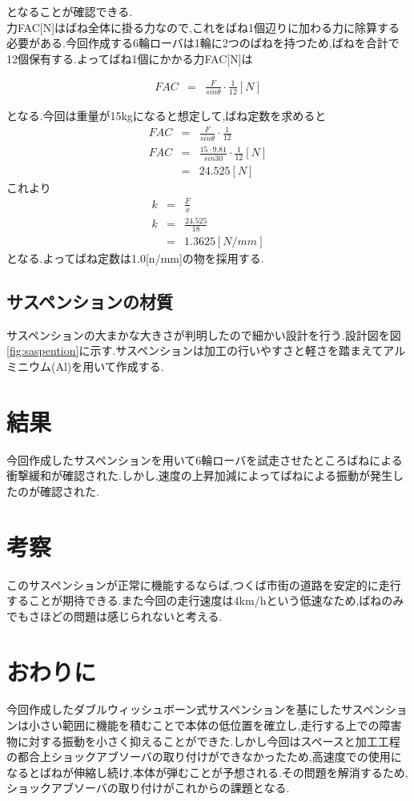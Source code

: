 \documentclass[a4paper]{jarticle}
\begin{document}
となることが確認できる.　\\
力FAC[N]はばね全体に掛る力なので,これをばね1個辺りに加わる力に除算する必要がある.今回作成する6輪ローバは1輪に2つのばねを持つため,ばねを合計で12個保有する.よってばね1個にかかる力FAC[N]は

\begin{eqnarray}
	FAC & = & \frac{F}{sinθ}\cdot \frac{1}{12} [N]
\end{eqnarray}

となる.今回は重量が15kgになると想定して,ばね定数を求めると
\begin{eqnarray}
	FAC & = & \frac{F}{sinθ}\cdot \frac{1}{12} \\
	FAC & = & \frac{15 \cdot  9.81}{sin30}\cdot \frac{1}{12} [N] \\
	     & =& 24.525[N] 
\end{eqnarray}
	{これより}　
\begin{eqnarray}
	k& = &  \frac{F}{x} \\
	k& = &  \frac{24.525}{18} \\
	 & = & 1.3625 [N/mm]
\end{eqnarray}
となる.よってばね定数は1.0[n/mm]の物を採用する.


\subsection{サスペンションの材質}
サスペンションの大まかな大きさが判明したので細かい設計を行う.設計図を図\ref{fig:saspention}に示す.サスペンションは加工の行いやすさと軽さを踏まえてアルミニウム(Al)を用いて作成する.

\section{結果}
今回作成したサスペンションを用いて6輪ローバを試走させたところばねによる衝撃緩和が確認された.しかし,速度の上昇加減によってばねによる振動が発生したのが確認された.

\section{考察}
このサスペンションが正常に機能するならば,つくば市街の道路を安定的に走行することが期待できる.また今回の走行速度は4km/hという低速なため,ばねのみでもさほどの問題は感じられないと考える.

\section{おわりに}
今回作成したダブルウィッシュボーン式サスペンションを基にしたサスペンションは小さい範囲に機能を積むことで本体の低位置を確立し,走行する上での障害物に対する振動を小さく抑えることができた.しかし今回はスペースと加工工程の都合上ショックアブソーバの取り付けができなかったため,高速度での使用になるとばねが伸縮し続け,本体が弾むことが予想される.その問題を解消するため,ショックアブソーバの取り付けがこれからの課題となる.
\end{document}
